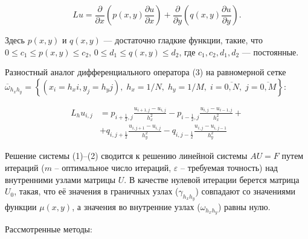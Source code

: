 \su
\begin{equation}
  Lu = \frac{\partial}{\partial x} \left( p(x, y) \frac{\partial u}{\partial x} \right) + \frac{\partial}{\partial y} \left( q(x, y) \frac{\partial u}{\partial y} \right).
\end{equation}

Здесь $ p(x, y) $ и $ q(x, y) $ --- достаточно гладкие функции, такие, что \\ $ 0 \leq c_1 \leqslant p(x, y) \leqslant c_2 $, $ 0 \leq d_1 \leqslant q(x, y) \leqslant d_2 $, где $ c_1, c_2, d_1, d_2 $ --- постоянные. \npar

Разностный аналог дифференциального оператора (3) на равномерной сетке $ \overline{\omega}_{h_x h_y} = \left\{ (x_i = h_x i, y_j = h_y j), \; h_x = 1 / N, \; h_y = 1 / M, \; i = \overline{0, N}, \; j = \overline{0, M} \right\} $:

\begin{equation}
\begin{aligned}
  L_h u_{i, j} & = p_{i+\frac{1}{2}, j} \frac{u_{i+1, j} - u_{i, j}}{h_x^2} - p_{i-\frac{1}{2}, j} \frac{u_{i, j} - u_{i-1, j}}{h_x^2} + \\
  & + q_{i, j+\frac{1}{2}} \frac{u_{i, j+1} - u_{i, j}}{h_y^2} - q_{i, j-\frac{1}{2}} \frac{u_{i, j} - u_{i, j-1}}{h_y^2}
\end{aligned}
\end{equation}

Решение системы (1)--(2) сводится к решению линейной системы $ AU = F $ путем итераций ($ m $ -- оптимальное число итераций, $ \varepsilon $ -- требуемая точность) над внутренними узлами матрицы $ U $. В качестве нулевой итерации берется матрица $ U_0 $, такая, что её значения в граничных узлах ($ \gamma_{h_x h_y} $) совпадают со значениями функции $ \mu(x, y) $, а значения во внутренние узлах ($ \omega_{h_x h_y} $) равны нулю. \npar

Рассмотренные методы:

